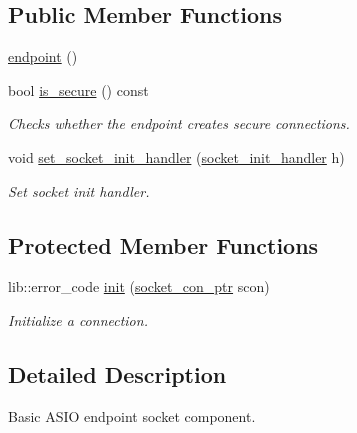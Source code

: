 \subsection*{Public Member Functions}
\begin{DoxyCompactItemize}
\item 
\hyperlink{classwebsocketpp_1_1transport_1_1asio_1_1basic__socket_1_1endpoint_a02a5dbe48a0b62ffcb3e071660a800f2}{endpoint} ()
\item 
bool \hyperlink{classwebsocketpp_1_1transport_1_1asio_1_1basic__socket_1_1endpoint_a83dcebb38e0fd78e40341955b61b8068}{is\+\_\+secure} () const 
\begin{DoxyCompactList}\small\item\em Checks whether the endpoint creates secure connections. \end{DoxyCompactList}\item 
void \hyperlink{classwebsocketpp_1_1transport_1_1asio_1_1basic__socket_1_1endpoint_a0b2b36f3a69b2a7d8f54858f4fbd09e7}{set\+\_\+socket\+\_\+init\+\_\+handler} (\hyperlink{namespacewebsocketpp_1_1transport_1_1asio_1_1basic__socket_a88f9c59fa40db3188769162db98edb93}{socket\+\_\+init\+\_\+handler} h)
\begin{DoxyCompactList}\small\item\em Set socket init handler. \end{DoxyCompactList}\end{DoxyCompactItemize}
\subsection*{Protected Member Functions}
\begin{DoxyCompactItemize}
\item 
lib\+::error\+\_\+code \hyperlink{classwebsocketpp_1_1transport_1_1asio_1_1basic__socket_1_1endpoint_a33e5c5a9086204933d3d2b3cacef4236}{init} (\hyperlink{classwebsocketpp_1_1transport_1_1asio_1_1basic__socket_1_1endpoint_afe9d86dd3fe9e8c73087f22daafcd70c}{socket\+\_\+con\+\_\+ptr} scon)
\begin{DoxyCompactList}\small\item\em Initialize a connection. \end{DoxyCompactList}\end{DoxyCompactItemize}


\subsection{Detailed Description}
Basic A\+S\+I\+O endpoint socket component. 

